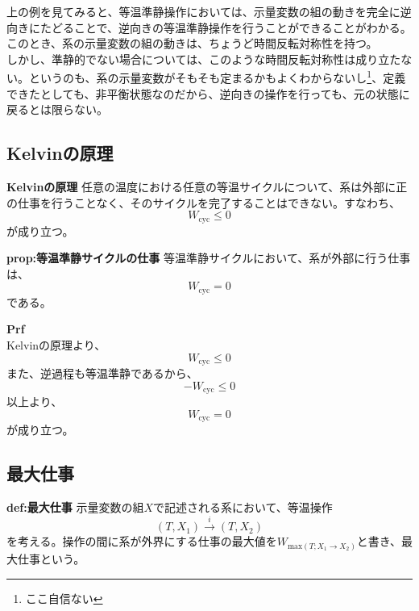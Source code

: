 \documentclass[a4paper,11pt]{jsarticle}
\begin{document}
上の例を見てみると、等温準静操作においては、示量変数の組の動きを完全に逆向きにたどることで、逆向きの等温準静操作を行うことができることがわかる。このとき、系の示量変数の組の動きは、ちょうど時間反転対称性を持つ。\\
しかし、準静的でない場合については、このような時間反転対称性は成り立たない。というのも、系の示量変数がそもそも定まるかもよくわからないし\footnote{ここ自信ない}、定義できたとしても、非平衡状態なのだから、逆向きの操作を行っても、元の状態に戻るとは限らない。


\subsection{Kelvinの原理}
\begin{itembox}[l]{\textbf{Kelvinの原理}}
    任意の温度における任意の等温サイクルについて、系は外部に正の仕事を行うことなく、そのサイクルを完了することはできない。すなわち、
    \begin{equation}
        W_{\text{cyc}} \leq 0
    \end{equation}
    が成り立つ。
\end{itembox}

\begin{itembox}[l]{\textbf{prop:等温準静サイクルの仕事}}
    等温準静サイクルにおいて、系が外部に行う仕事は、
    \begin{equation}
        W_{\text{cyc}} = 0
    \end{equation}
    である。
\end{itembox}
\textbf{Prf}\\
Kelvinの原理より、
\begin{equation}
    W_{\text{cyc}} \leq 0
\end{equation}
また、逆過程も等温準静であるから、
\begin{equation}
    -W_{\text{cyc}} \leq 0
\end{equation}
以上より、
\begin{equation}
    W_{\text{cyc}} = 0
\end{equation}
が成り立つ。\\

\subsection{最大仕事}
\begin{itembox}[l]{\textbf{def:最大仕事}}
    示量変数の組$X$で記述される系において、等温操作
    \begin{equation}
        (T,X_1) \xrightarrow{i} (T,X_2)
    \end{equation}
    を考える。操作の間に系が外界にする仕事の最大値を$W_{\text{max}(T;X_1\rightarrow X_2)}$と書き、最大仕事という。
\end{itembox}
\end{document}
